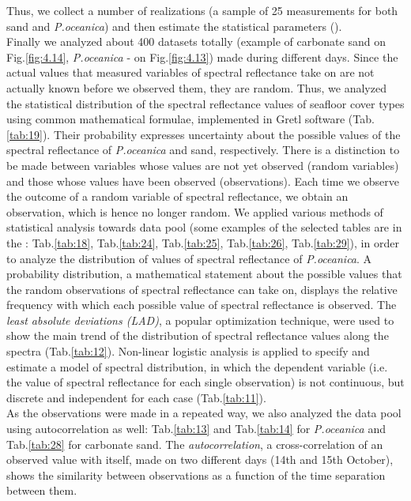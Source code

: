 \documentclass[11pt]{article}
\begin{document}
Thus, we collect a number of realizations (a sample of 25 measurements for both sand and \textit{P.oceanica}) and then estimate the statistical parameters (). \\
Finally we analyzed about 400 datasets totally (example of carbonate sand on Fig.\ref{fig:4.14}, \textit{P.oceanica} - on  Fig.\ref{fig:4.13}) made during different days. 
Since the actual values that measured variables of spectral reflectance take on are not actually known before we observed them, they are random. 
Thus, we analyzed the statistical distribution of the spectral reflectance values of seafloor cover types using common mathematical formulae, implemented in Gretl software (Tab.\ref{tab:19}). 
Their probability expresses uncertainty about the possible values of the spectral reflectance of \textit{P.oceanica} and sand, respectively.
There is a distinction to be made between variables whose values are not yet observed (random variables) and those whose values have been observed (observations). 
Each time we observe the outcome of a random variable of spectral reflectance, we obtain an observation, which is hence no longer random. 
We applied various methods of statistical analysis towards data pool (some examples of the selected tables are in the : Tab.\ref{tab:18}, Tab.\ref{tab:24}, Tab.\ref{tab:25}, Tab.\ref{tab:26}, Tab.\ref{tab:29}), in order to analyze the distribution of values of spectral reflectance of \textit{P.oceanica}. 
A probability distribution, a mathematical statement about the possible values that the random observations of spectral reflectance can take on, displays the relative frequency with which each possible value of spectral reflectance is observed. 
The \textit{least absolute deviations (LAD)}, a popular optimization technique, were used to show the main trend of the distribution of spectral reflectance values along the spectra (Tab.\ref{tab:12}). Non-linear logistic analysis is applied to specify and estimate a model of spectral distribution, in which the dependent variable (i.e. the value of spectral reflectance for each single observation) is not continuous, but discrete and independent for each case (Tab.\ref{tab:11}). \\
As the observations were made in a repeated way, we also analyzed the data pool using autocorrelation as well: Tab.\ref{tab:13} and Tab.\ref{tab:14} for \textit{P.oceanica} and Tab.\ref{tab:28} for carbonate sand. The \textit{autocorrelation}, a cross-correlation of an observed value with itself, made on two different days (14th and 15th October), shows the similarity between observations as a function of the time separation between them. 
\end{document}
